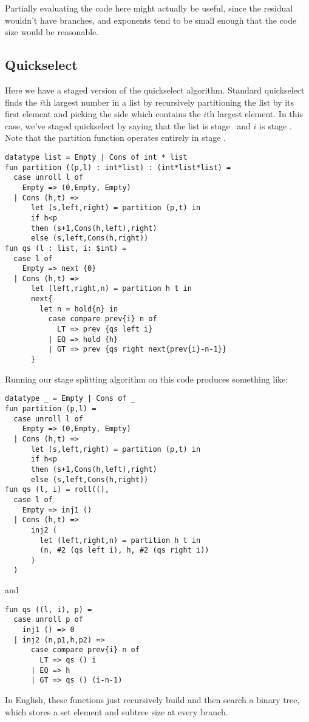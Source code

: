 Partially evaluating the code here might actually be useful, since the residual wouldn't have branches,
and exponents tend to be small enough that the code size would be reasonable.

\subsection{Quickselect}

Here we have a staged version of the quickselect algorithm.
Standard quickselect finds the $i$th largest number in a list by recursively partitioning the list by its 
first element and picking the side which contains the $i$th largest element.
In this case, we've staged quickselect by saying that the list is stage \bbone\ and $i$ is stage \bbtwo.
Note that the partition function operates entirely in stage \bbone.

\begin{lstlisting} 
datatype list = Empty | Cons of int * list
fun partition ((p,l) : int*list) : (int*list*list) =
  case unroll l of 
    Empty => (0,Empty, Empty) 
  | Cons (h,t) =>
      let (s,left,right) = partition (p,t) in
      if h<p 
      then (s+1,Cons(h,left),right)
      else (s,left,Cons(h,right))
fun qs (l : list, i: $int) = 
  case l of
    Empty => next {0}
  | Cons (h,t) => 
      let (left,right,n) = partition h t in
      next{
        let n = hold{n} in
          case compare prev{i} n of
            LT => prev {qs left i}
          | EQ => hold {h}
          | GT => prev {qs right next{prev{i}-n-1}}
      }	
\end{lstlisting}
Running our stage splitting algorithm on this code produces something like:
\begin{lstlisting} 
datatype _ = Empty | Cons of _
fun partition (p,l) =
  case unroll l of 
    Empty => (0,Empty, Empty) 
  | Cons (h,t) =>
      let (s,left,right) = partition (p,t) in
      if h<p 
      then (s+1,Cons(h,left),right)
      else (s,left,Cons(h,right))
fun qs (l, i) = roll((), 
  case l of
    Empty => inj1 ()
  | Cons (h,t) => 
      inj2 (
        let (left,right,n) = partition h t in
        (n, #2 (qs left i), h, #2 (qs right i))
      )
  )
\end{lstlisting}
and 
\begin{lstlisting} 
fun qs ((l, i), p) = 
  case unroll p of
    inj1 () => 0
  | inj2 (n,p1,h,p2) => 
      case compare prev{i} n of
        LT => qs () i
      | EQ => h
      | GT => qs () (i-n-1)
\end{lstlisting}
In English, these functions just recursively build and then search a binary tree,
which stores a set element and subtree size at every branch.

